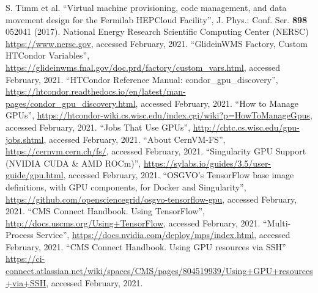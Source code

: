 \documentclass{webofc}
\begin{document}
\begin{thebibliography}{}
 S. Timm et al. ``Virtual machine provisioning, code management, and data movement design for the Fermilab HEPCloud Facility'', J. Phys.: Conf. Ser. \textbf{898} 052041 (2017).
 National Energy Research Scientific Computing Center (NERSC) \url{https://www.nersc.gov}, accessed February, 2021.
 ``GlideinWMS Factory, Custom HTCondor Variables'', \url{https://glideinwms.fnal.gov/doc.prd/factory/custom_vars.html}, accessed February, 2021.
 ``HTCondor Reference Manual: condor\_gpu\_discovery'', \url{https://htcondor.readthedocs.io/en/latest/man-pages/condor_gpu_discovery.html}, accessed February, 2021.
``How to Manage GPUs'', \url{https://htcondor-wiki.cs.wisc.edu/index.cgi/wiki?p=HowToManageGpus}, accessed February, 2021.
 ``Jobs That Use GPUs'', \url{http://chtc.cs.wisc.edu/gpu-jobs.shtml}, accessed February, 2021.
 ``About CernVM-FS'', \url{https://cernvm.cern.ch/fs/}, accessed February, 2021.
 ``Singularity GPU Support (NVIDIA CUDA \& AMD ROCm)'', \url{https://sylabs.io/guides/3.5/user-guide/gpu.html}, accessed February, 2021.
 ``OSGVO's TensorFlow base image definitions, with GPU components, for Docker and Singularity'', \url{https://github.com/opensciencegrid/osgvo-tensorflow-gpu}, accessed February, 2021.
 ``CMS Connect Handbook. Using TensorFlow'', \url{http://docs.uscms.org/Using+TensorFlow}, accessed February, 2021.
 ``Multi-Process Service'', \url{https://docs.nvidia.com/deploy/mps/index.html}, accessed February, 2021.
 ``CMS Connect Handbook. Using GPU resources via SSH'' \url{https://ci-connect.atlassian.net/wiki/spaces/CMS/pages/804519939/Using+GPU+resources+via+SSH}, accessed February, 2021.

\end{thebibliography}
\end{document}
